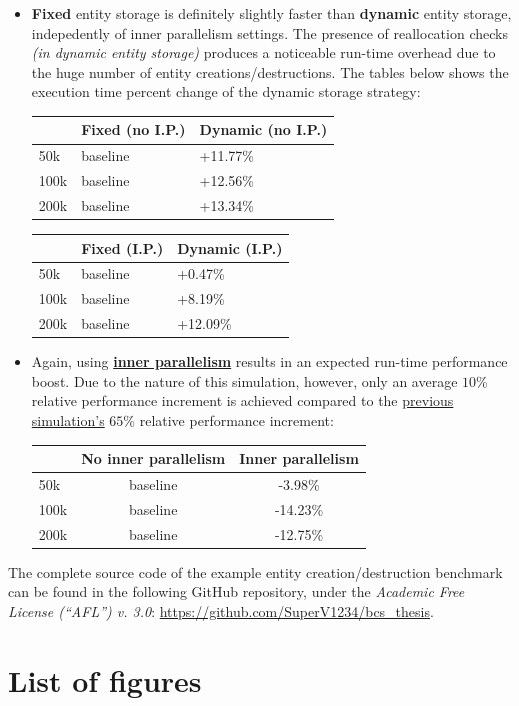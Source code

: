 \documentclass[oneside, 12pt, a4paper, openany]{book}
\begin{document}
\begin{itemize}
\item
  \textbf{Fixed} entity storage is definitely slightly faster than
  \textbf{dynamic} entity storage, indepedently of inner parallelism
  settings. The presence of reallocation checks \emph{(in dynamic entity
  storage)} produces a noticeable run-time overhead due to the huge
  number of entity creations/destructions. The tables below shows the
  execution time percent change of the dynamic storage strategy:

  \begin{longtable}[]{@{}lll@{}}
  \toprule
  & Fixed (no I.P.) & Dynamic (no I.P.)\tabularnewline
  \midrule
  \endhead
  50k & baseline & +11.77\%\tabularnewline
  100k & baseline & +12.56\%\tabularnewline
  200k & baseline & +13.34\%\tabularnewline
  \bottomrule
  \end{longtable}

  \begin{longtable}[]{@{}lll@{}}
  \toprule
  & Fixed (I.P.) & Dynamic (I.P.)\tabularnewline
  \midrule
  \endhead
  50k & baseline & +0.47\%\tabularnewline
  100k & baseline & +8.19\%\tabularnewline
  200k & baseline & +12.09\%\tabularnewline
  \bottomrule
  \end{longtable}
\item
  Again, using
  \protect\hyperlink{multithreading_inner_par}{\textbf{inner
  parallelism}} results in an expected run-time performance boost. Due
  to the nature of this simulation, however, only an average \(10\)\%
  relative performance increment is achieved compared to the
  \protect\hyperlink{bench_parsim_conc}{previous simulation's} \(65\)\%
  relative performance increment:

  \begin{longtable}[]{@{}lcc@{}}
  \toprule
  & No inner parallelism & Inner parallelism\tabularnewline
  \midrule
  \endhead
  50k & baseline & -3.98\%\tabularnewline
  100k & baseline & -14.23\%\tabularnewline
  200k & baseline & -12.75\%\tabularnewline
  \bottomrule
  \end{longtable}
\end{itemize}

The complete source code of the example entity creation/destruction
benchmark can be found in the following GitHub repository, under the
\emph{Academic Free License (``AFL'') v. 3.0}:
\url{https://github.com/SuperV1234/bcs_thesis}.

\chapter*{List of figures}\label{list-of-figures}
\end{document}
